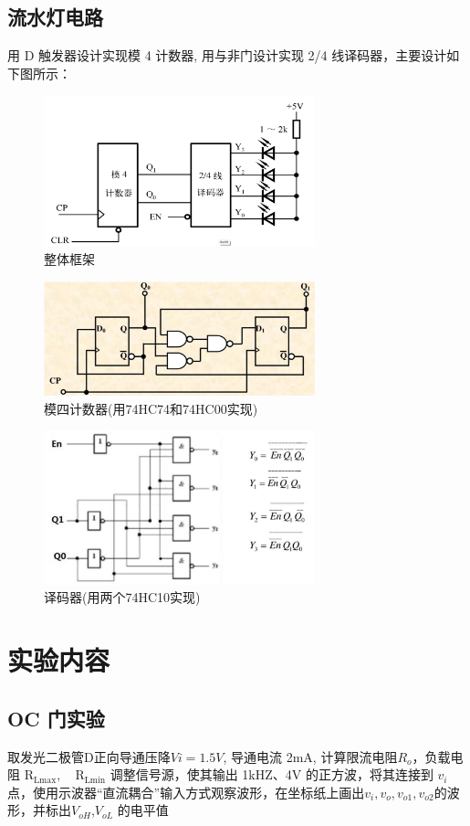 \documentclass[a4paper,11pt,UTF8]{article}
\begin{document}
\subsection{流水灯电路}
用 D 触发器设计实现模 4 计数器, 用与非门设计实现 2/4 线译码器，主要设计如下图所示：
\begin{figure}[!ht]
	\centering
	\includegraphics[width=0.7\textwidth]{frame}
	\caption{整体框架}
\end{figure}
\begin{figure}[!ht]
	\centering
	\includegraphics[width=0.7\textwidth]{Cal}
	\caption{模四计数器(用74HC74和74HC00实现)}
\end{figure}
\begin{figure}[!ht]
	\centering
	\includegraphics[width=0.7\textwidth]{yimaqi}
	\caption{译码器(用两个74HC10实现)}
\end{figure}
\section{实验内容}
\subsection{OC 门实验}
取发光二极管D正向导通压降$ Vi=1.5V$, 导通电流 2mA, 计算限流电阻$R_o$，负载电阻 $\mathrm{R}_{\mathrm{Lmax}},\quad\mathrm{R}_{\mathrm{Lmin}}$
调整信号源，使其输出 1kHZ、4V 的正方波，将其连接到 $v_i$点，使用示波器“直流耦合”输入方式观察波形，在坐标纸上画出$v_i, v_o, v_{o1}, v_{o2}$的波形，并标出$V_{oH}$,$V_{oL}$ 的电平值
\end{document}
